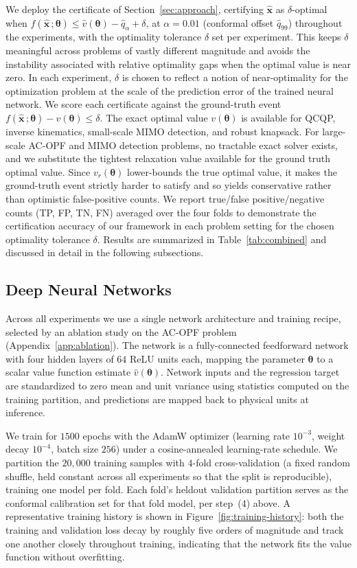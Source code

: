 \documentclass[10pt]{article} %
\theoremstyle{plain}
\theoremstyle{definition}
\theoremstyle{remark}
\begin{document}
We deploy the certificate of Section~\ref{sec:approach}, certifying $\hat{\mathbf{x}}$ as $\delta$-optimal when $f(\hat{\mathbf{x}}\,;\bm{\theta}) \leq \hat{v}(\bm{\theta}) - \hat{q}_\alpha + \delta$, at $\alpha = 0.01$ (conformal offset $\hat q_{99}$) throughout the experiments, with the optimality tolerance $\delta$ set per experiment. This keeps $\delta$ meaningful across problems of vastly different magnitude and avoids the instability associated with relative optimality gaps when the optimal value is near zero. In each experiment, $\delta$ is chosen to reflect a notion of near-optimality for the optimization problem at the scale of the prediction error of the trained neural network. We score each certificate against the ground-truth event $f(\hat{\mathbf{x}}\,;\bm{\theta}) - v(\bm{\theta}) \leq \delta$. The exact optimal value $v(\bm\theta)$ is available for QCQP, inverse kinematics, small-scale MIMO detection, and robust knapsack. For large-scale AC-OPF and MIMO detection problems, no tractable exact solver exists, and we substitute the tightest relaxation value available for the ground truth optimal value. Since $v_r(\bm{\theta})$ lower-bounds the true optimal value, it makes the ground-truth event strictly harder to satisfy and so yields conservative rather than optimistic false-positive counts. We report true/false positive/negative counts (TP, FP, TN, FN) averaged over the four folds to demonstrate the certification accuracy of our framework in each problem setting for the chosen optimality tolerance $\delta$. Results are summarized in Table~\ref{tab:combined} and discussed in detail in the following subsections.

\subsection*{Deep Neural Networks} \label{subsec:dnn}

Across all experiments we use a single network architecture and training recipe, selected by an ablation study on the AC-OPF problem (Appendix~\ref{app:ablation}). The network is a fully-connected feedforward network with four hidden layers of $64$ ReLU units each, mapping the parameter $\bm{\theta}$ to a scalar value function estimate $\hat{v}(\bm{\theta})$. Network inputs and the regression target are standardized to zero mean and unit variance using statistics computed on the training partition, and predictions are mapped back to physical units at inference.

We train for $1500$ epochs with the AdamW optimizer (learning rate $10^{-3}$, weight decay $10^{-4}$, batch size $256$) under a cosine-annealed learning-rate schedule. We partition the $20{,}000$ training samples with $4$-fold cross-validation (a fixed random shuffle, held constant across all experiments so that the split is reproducible), training one model per fold. Each fold's heldout validation partition serves as the conformal calibration set for that fold model, per step~(4) above. A representative training history is shown in Figure~\ref{fig:training-history}: both the training and validation loss decay by roughly five orders of magnitude and track one another closely throughout training, indicating that the network fits the value function without overfitting.
\end{document}
